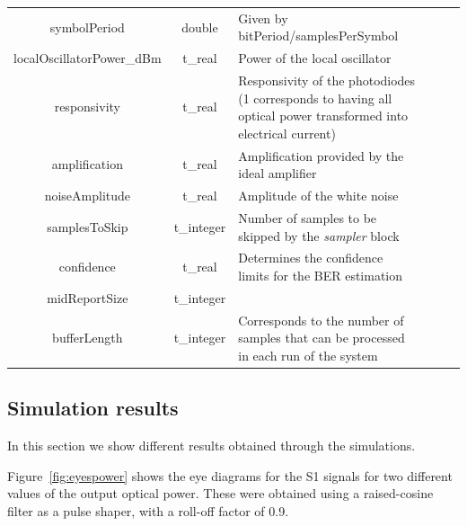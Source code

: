 \begin{table}[H]
\begin{tabular}{|c|c|p{70mm}|ccp{70mm}}
		symbolPeriod & double & Given by bitPeriod/samplesPerSymbol &    \\ \cline{1-3}
		localOscillatorPower\_dBm & t\_real & Power of the local oscillator &    \\ \cline{1-3}
		responsivity & t\_real & Responsivity of the photodiodes (1 corresponds to having all optical power transformed into electrical current) &    \\ \cline{1-3}
		amplification & t\_real & Amplification provided by the ideal amplifier &    \\ \cline{1-3}
		noiseAmplitude & t\_real & Amplitude of the white noise &    \\ \cline{1-3}
		samplesToSkip & t\_integer & Number of samples to be skipped by the \textit{sampler} block &    \\ \cline{1-3}
		confidence & t\_real & Determines the confidence limits for the BER estimation &    \\ \cline{1-3}
		midReportSize & t\_integer &  &    \\ \cline{1-3}
		bufferLength & t\_integer & Corresponds to the number of samples that can be processed in each run of the system &    \\ \cline{1-3}
		\end{tabular}
		\label{table:in_par}
		\end{table}

\subsection*{Simulation results}

In this section we show different results obtained through the simulations.

Figure~\ref{fig:eyespower} shows the eye diagrams for the S1 signals for two different values of the output optical power. These were obtained using a raised-cosine filter as a pulse shaper, with a roll-off factor of 0.9.

